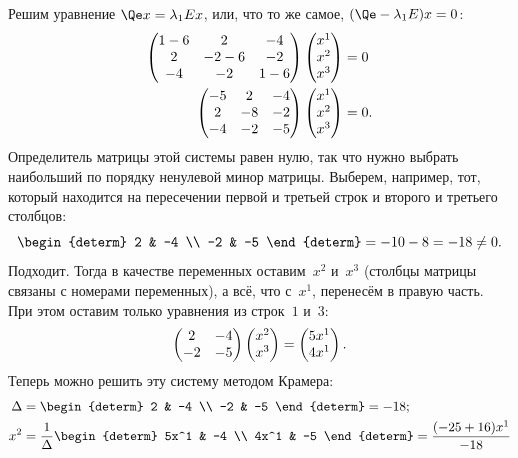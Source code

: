 \begin{solution}
		Решим уравнение $\Qe x = \lambda_1 E x$, или, что то же самое, $(\Qe - \lambda_1 E) x = 0$:
		\begin{align*}
			\begin{pmatrix}
				1 - 6 & 2 & -4 \\
				2 & -2-6 & -2 \\
				-4 & -2 & 1-6
			\end{pmatrix}
			\begin{pmatrix}x^1 \\ x^2 \\ x^3\end{pmatrix}
			&=
			0
			\\
			\begin{pmatrix}
				-5 & 2 & -4 \\
				2 & -8 & -2 \\
				-4 & -2 & -5
			\end{pmatrix}
			\begin{pmatrix}x^1 \\ x^2 \\ x^3\end{pmatrix}
			&=
			0
			.
		\end{align*}
		Определитель матрицы этой системы равен нулю, так что нужно выбрать наибольший по порядку ненулевой минор матрицы. Выберем, например, тот, который находится на пересечении первой и третьей строк и второго и третьего столбцов:
		\[
			\begin{determ}
				2 & -4 \\
				-2 & -5
			\end{determ}
			=
			-10 - 8 = -18 \neq 0
			.
		\]
		Подходит. Тогда в качестве переменных оставим~$x^2$ и~$x^3$ (столбцы матрицы связаны с номерами переменных), а всё, что с~$x^1$, перенесём в правую часть. При этом оставим только уравнения из строк~$1$ и~$3$:
		\[
			\begin{pmatrix}
				2 & -4 \\
				-2 & -5
			\end{pmatrix}
			\begin{pmatrix}x^2 \\ x^3\end{pmatrix}
			=
			\begin{pmatrix}5x^1 \\ 4x^1\end{pmatrix}
			.
		\]
		Теперь можно решить эту систему методом Крамера:
		\begin{align*}
			\Delta &= 
			\begin{determ}
				2 & -4 \\
				-2 & -5
			\end{determ}
			=
			-18;
			\\
			x^2 &=
			\frac{1}{\Delta}
			\begin{determ}
				5x^1 & -4 \\
				4x^1 & -5
			\end{determ}
			=
			\frac{(-25+16)x^1}{-18}

\end{align*}
\end{solution}

